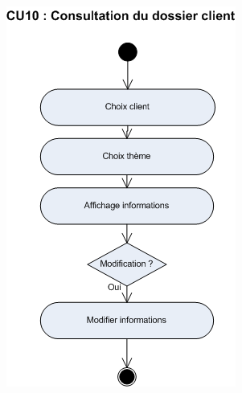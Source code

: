 \begin {center}
\includegraphics[width=\textwidth]{../../diagrammeActivite/DACU10.png}
\end {center}

